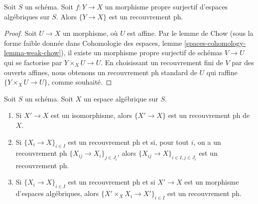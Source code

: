 \begin{lemma}
\label{lemma-surjective-proper-ph}
Soit $S$ un schéma. Soit $f : Y \to X$ un morphisme propre surjectif
d'espaces algébriques sur $S$. Alors $\{Y \to X\}$ est un recouvrement ph.
\end{lemma}

\begin{proof}
Soit $U \to X$ un morphisme, où $U$ est affine.
Par le lemme de Chow (sous la forme faible donnée dans
Cohomologie des espaces, lemme \ref{spaces-cohomology-lemma-weak-chow}),
il existe un morphisme propre surjectif de schémas
$V \to U$ qui se factorise par $Y \times_X U \to U$.
En choisissant un recouvrement fini de $V$ par des ouverts affines, nous obtenons un
recouvrement ph standard de $U$ qui raffine $\{Y \times_X U \to U\}$,
comme souhaité.
\end{proof}

\begin{lemma}
\label{lemma-ph}
Soit $S$ un schéma. Soit $X$ un espace algébrique sur $S$.
\begin{enumerate}
\item Si $X' \to X$ est un isomorphisme, alors $\{X' \to X\}$
est un recouvrement ph de $X$.
\item Si $\{X_i \to X\}_{i\in I}$ est un recouvrement ph et si, pour tout
$i$, on a un recouvrement ph $\{X_{ij} \to X_i\}_{j\in J_i}$, alors
$\{X_{ij} \to X\}_{i \in I, j\in J_i}$ est un recouvrement ph.
\item Si $\{X_i \to X\}_{i\in I}$ est un recouvrement ph
et si $X' \to X$ est un morphisme d'espaces algébriques, alors
$\{X' \times_X X_i \to X'\}_{i\in I}$ est un recouvrement ph.
\end{enumerate}
\end{lemma}


